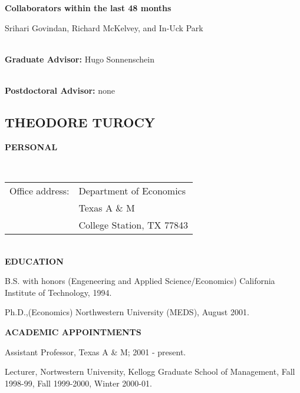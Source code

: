 \documentclass[12pt]{article}
\begin{document}
\noindent
{\bf Collaborators within the last 48 months} 

Srihari Govindan, Richard McKelvey, and In-Uck Park

\ \\
\noindent
{\bf Graduate Advisor:} Hugo Sonnenschein

\ \\
\noindent
{\bf Postdoctoral Advisor:} none

\newpage
\subsection{THEODORE TUROCY}

\noindent
{\bf PERSONAL} 

\ \\
\begin{tabular}{ll}
Office address:&Department of Economics \\
&Texas A \& M \\
&College Station, TX 77843 \\
\end{tabular}

\ \\
\noindent
{\bf EDUCATION}
\begin{description}
\item
B.S. with honors (Engeneering and Applied Science/Economics)
California Institute of Technology, 1994.
\item
Ph.D.,(Economics) Northwestern University (MEDS), August 2001.
\end{description}

\noindent
{\bf ACADEMIC APPOINTMENTS}
\begin{description}
\item
Assistant Professor, Texas A \& M; 2001 - present. 
\item
Lecturer, Nortwestern University, Kellogg Graduate School of
Management, Fall 1998-99, Fall 1999-2000, Winter 2000-01.
\end{description}
\end{document}
